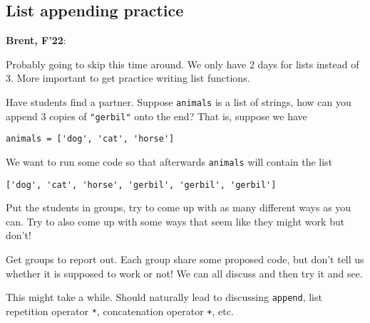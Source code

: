 \documentclass{article}
\newenvironment{reflect}[1]
{
  \noindent
  \begin{lrbox}{\reflectbox}
    \begin{minipage}[t]{\textwidth}
      \textbf{#1}:
}{
    \end{minipage}
  \end{lrbox}
  \fbox{\usebox{\reflectbox}}
}
\begin{document}
\subsection*{List appending practice}

\begin{reflect}{Brent, F'22}
  Probably going to skip this time around.  We only have 2 days for
  lists instead of 3.  More important to get practice writing list
  functions.
\end{reflect}

Have students find a partner. Suppose \verb|animals| is a list of
strings, how can you append 3 copies of \verb|"gerbil"| onto the end?
That is, suppose we have
\begin{verbatim}
animals = ['dog', 'cat', 'horse']
\end{verbatim}
We want to run some code so that afterwards \verb|animals| will
contain the list
\begin{verbatim}
['dog', 'cat', 'horse', 'gerbil', 'gerbil', 'gerbil']
\end{verbatim}
Put the students in groups, try to come up with as many different ways
as you can.  Try to also come up with some ways that seem like they
might work but don't!

Get groups to report out.  Each group share some proposed code, but
don't tell us whether it is supposed to work or not!  We can all
discuss and then try it and see.

This might take a while.  Should naturally lead to discussing
\verb|append|, list repetition operator \verb|*|, concatenation
operator \verb|+|, etc.
\end{document}
